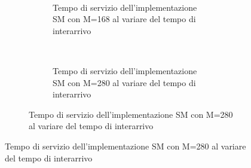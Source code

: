 \begin{figure}[p]
\begin{subfigure}[b]{.5\columnwidth}
    ~
    \begin{subfigure}[b]{\textwidth}
      \centering
      \addtocounter{subfigure}{-1}
      \renewcommand\thesubfigure{\alph{subfigure}2}
      \resizebox{\columnwidth}{!}{}
      \caption{Tempo di servizio dell'implementazione SM con M=168 al variare del tempo di interarrivo}
      \label{fig:scalability_SM_size168}
    \end{subfigure}
    ~
    \begin{subfigure}[b]{\textwidth}
      \centering
      \addtocounter{subfigure}{-1}
      \renewcommand\thesubfigure{\alph{subfigure}3}
      \resizebox{\columnwidth}{!}{}
      \caption{Tempo di servizio dell'implementazione SM con M=280 al variare del tempo di interarrivo}
      \label{fig:scalability_SM_size280}
    \end{subfigure}
    \label{fig:allscalability_SM}
  \end{subfigure}
\end{figure}




